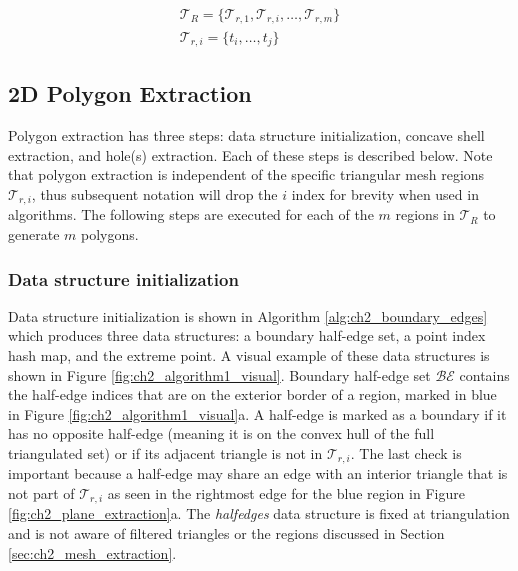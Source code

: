 \begin{align}
    \mathcal{T}_R = \{ \mathcal{T}_{r,1}, \mathcal{T}_{r,i},  \ldots, \mathcal{T}_{r,m} \} \\
    \mathcal{T}_{r,i} =  \{ t_{i}, \ldots, t_{j} \}
\end{align}


\subsection{2D Polygon Extraction}\label{sec:ch2_polygon_extraction}

Polygon extraction has three steps: data structure initialization, concave shell extraction, and hole(s) extraction. Each of these steps is described below. Note that polygon extraction is independent of the specific triangular mesh regions $\mathcal{T}_{r,i}$, thus subsequent notation will drop the $i$ index for brevity when used in algorithms. The following steps are executed for each of the $m$ regions in $\mathcal{T}_{R}$ to generate $m$ polygons.

\subsubsection{Data structure initialization}

Data structure initialization is shown in Algorithm \ref{alg:ch2_boundary_edges} which produces three data structures: a boundary half-edge set, a point index hash map, and the extreme point. A visual example of these data structures is shown in Figure \ref{fig:ch2_algorithm1_visual}. Boundary half-edge set $\mathcal{BE}$ contains the half-edge indices that are on the exterior border of a region, marked in blue in Figure \ref{fig:ch2_algorithm1_visual}a.  A half-edge is marked as a boundary if it has no opposite half-edge (meaning it is on the convex hull of the full triangulated set) or if its adjacent triangle is not in $\mathcal{T}_{r,i}$. The last check is important because a half-edge may share an edge with an interior triangle that is not part of $\mathcal{T}_{r,i}$ as seen in the rightmost edge for the blue region in Figure \ref{fig:ch2_plane_extraction}a. The \emph{halfedges} data structure is fixed at triangulation and is not aware of filtered triangles or the regions discussed in Section \ref{sec:ch2_mesh_extraction}.

